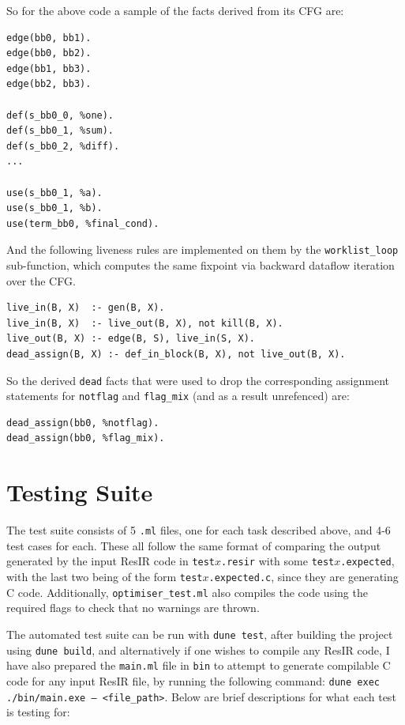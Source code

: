 \documentclass[11pt, a4paper]{article}
\begin{document}
\medskip

So for the above code a sample of the facts derived from its CFG are:

\begin{lstlisting}
edge(bb0, bb1).
edge(bb0, bb2).
edge(bb1, bb3).
edge(bb2, bb3).

def(s_bb0_0, %one).
def(s_bb0_1, %sum).
def(s_bb0_2, %diff).
...

use(s_bb0_1, %a).
use(s_bb0_1, %b).
use(term_bb0, %final_cond).
\end{lstlisting}

\medskip

And the following liveness rules are implemented on them by the \texttt{worklist\_loop} sub-function, which computes
the same fixpoint via backward dataflow iteration over the CFG.
\begin{lstlisting}
live_in(B, X)  :- gen(B, X).
live_in(B, X)  :- live_out(B, X), not kill(B, X).
live_out(B, X) :- edge(B, S), live_in(S, X).
dead_assign(B, X) :- def_in_block(B, X), not live_out(B, X).
\end{lstlisting}

So the derived \texttt{dead} facts that were used to drop the corresponding assignment statements for \texttt{notflag}
and \texttt{flag\_mix} (and as a result unrefenced) are:
\begin{lstlisting}
dead_assign(bb0, %notflag).
dead_assign(bb0, %flag_mix).
\end{lstlisting}

\bigskip

\section{Testing Suite}
The test suite consists of 5 \texttt{.ml} files, one for each task described above, and 4-6 test cases for each. 
These all follow the same format of comparing the output generated by the input ResIR code in \texttt{test$x$.resir}
with some \texttt{test$x$.expected}, with the last two being of the form \texttt{test$x$.expected.c}, since they are generating C code.
Additionally, \texttt{optimiser\_test.ml} also compiles the code using the required flags to check that no warnings are thrown.

\medskip

The automated test suite can be run with \texttt{dune test}, after building the project using \texttt{dune build},
and alternatively if one wishes to compile any ResIR code,
I have also prepared the \texttt{main.ml} file in \texttt{bin} to attempt to generate compilable C code for any 
input ResIR file, by running the following command: \texttt{dune exec ./bin/main.exe -- <file\_path>}. Below are brief descriptions
for what each test is testing for:
\end{document}
